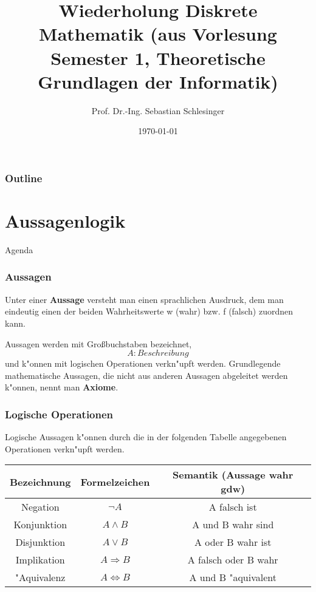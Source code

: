 \documentclass{beamer}
\title[Diskrete Mathematik]{Wiederholung Diskrete Mathematik (aus Vorlesung Semester 1, Theoretische Grundlagen der Informatik)}
\author[Sebastian Schlesinger]{Prof. Dr.-Ing. Sebastian Schlesinger}
\institute[HWR Berlin]{Berlin School for Economics and Law}
\date{\today}
\begin{document}
 \begin{frame}
\titlepage
\end{frame}



\begin{frame}
  \frametitle{Outline}
  \tableofcontents
\end{frame}
\section{Aussagenlogik}
\begin{frame}{Agenda}
   
    
  \tableofcontents[currentsection]
  \end{frame}
\begin{frame}
\frametitle{Aussagen}

Unter einer \textbf{Aussage} versteht man einen sprachlichen Ausdruck, dem man eindeutig einen der beiden Wahrheitswerte w (\glqq wahr\grqq) bzw. f (\glqq falsch\grqq) zuordnen kann. 

Aussagen werden mit Gro\ss buchstaben bezeichnet, \[A:Beschreibung\]
und k"onnen mit logischen Operationen verkn"upft werden. Grundlegende mathematische Aussagen, die nicht aus anderen Aussagen abgeleitet werden k"onnen, nennt man \textbf{Axiome}.
\end{frame}



\begin{frame}
  \frametitle{Logische Operationen}
  Logische Aussagen k"onnen durch die in der folgenden Tabelle angegebenen Operationen verkn"upft werden.
  
  \begin{tabular}[h]{c|c|c}
   
    Bezeichnung & Formelzeichen & Semantik (Aussage wahr gdw) \\
    \hline
    Negation & $\neg A$ &  A falsch ist \\
    Konjunktion & $A\wedge B$ &  A und B wahr sind \\
    Disjunktion & $A\vee B$ &  A oder B wahr ist \\
    Implikation & $A\Rightarrow B$ &  A falsch oder B wahr \\
    "Aquivalenz & $A\Leftrightarrow B$ & A und B "aquivalent 


    \end{tabular}
\end{frame}
\end{document}
